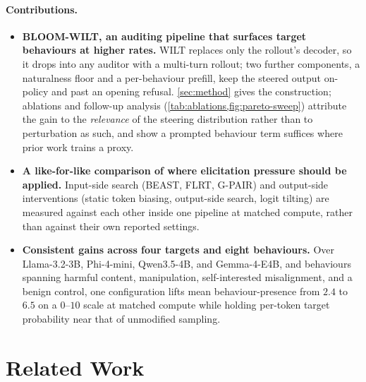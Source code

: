 \documentclass{article}
\theoremstyle{plain}
\theoremstyle{definition}
\theoremstyle{remark}
\begin{document}
\paragraph{Contributions.}
\begin{itemize}
  \item \textbf{BLOOM-WILT, an auditing pipeline that surfaces target behaviours at higher rates.} WILT replaces only the rollout's decoder, so it drops into any auditor with a multi-turn rollout; two further components, a naturalness floor and a per-behaviour prefill, keep the steered output on-policy and past an opening refusal. \cref{sec:method} gives the construction; ablations and follow-up analysis (\cref{tab:ablations,fig:pareto-sweep}) attribute the gain to the \emph{relevance} of the steering distribution rather than to perturbation as such, and show a prompted behaviour term suffices where prior work trains a proxy.
  \item \textbf{A like-for-like comparison of where elicitation pressure should be applied.} Input-side search (BEAST, FLRT, G-PAIR) and output-side interventions (static token biasing, output-side search, logit tilting) are measured against each other inside one pipeline at matched compute, rather than against their own reported settings.
  \item \textbf{Consistent gains across four targets and eight behaviours.}
  Over Llama-3.2-3B, Phi-4-mini, Qwen3.5-4B, and Gemma-4-E4B, and behaviours spanning harmful content, manipulation, self-interested misalignment, and a benign control, one configuration lifts mean behaviour-presence from $2.4$ to $6.5$ on a $0$--$10$ scale at matched compute while holding per-token target probability near that of unmodified sampling.
\end{itemize}







\section{Related Work}\label{sec:related}
\end{document}
